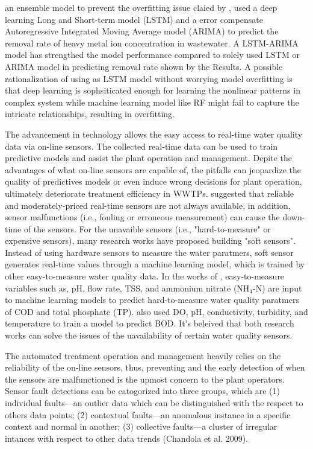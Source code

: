 an ensemble model to prevent the overfitting issue claied by \citet{zaghloulDevelopmentEnsembleMachine2021}, \citet{zhuPredictionMethodElectrocoagulation2021} used a deep learning Long and Short-term model (LSTM) and a error compensate Autoregressive Integrated Moving Average model (ARIMA) to predict the removal rate of heavy metal ion concentration in wastewater. A LSTM-ARIMA model has strengthed the model performance compared to solely used LSTM or ARIMA model in predicting removal rate shown by the Results. A possible rationalization of using as LSTM model without worrying model overfitting is that deep learning is sophsiticated enough for learning the nonlinear patterns in complex system while machine learning model like RF might fail to capture the intricate relationships, resulting in overfitting.

The advancement in technology allows the easy access to real-time water quality data via on-line sensors. The collected real-time data can be used to train predictive models and assist the plant operation and management. Depite the advantages of what on-line sensors are capable of, the pitfalls can jeopardize the quality of predictives models or even induce wrong decisions for plant operation, ultimately deteriorate treatment efficiency in WWTPs. \citet{haimiShallWeUse2015} suggested that reliable and moderately-priced real-time sensors are not always available, in addition, sensor malfunctions (i.e., fouling or erroneous measurement) can cause the down-time of the sensors. For the unavaible sensors (i.e., "hard-to-measure" or expensive sensors), many research works have proposed building "soft sensors". Instead of using hardware sensors to measure the water paratmers, soft sensor generates real-time values through a machine learning model, which is trained by other easy-to-measure water quality data. In the works of \citet{wangExplicitInterpretableNonlinear2019}, easy-to-measure variables such as, pH, flow rate, TSS, and ammonium nitrate (NH$_4$-N) are input to machine learning models to predict hard-to-measure water quality paratmers of COD and total phosphate (TP). \citet{pattnaikMachineLearningBased2021} also used DO, pH, conductivity, turbidity, and temperature to train a model to predict BOD. It's beleived that both research works can solve the issues of the uavailability of certain water quality sensors. 

The automated treatment operation and management heavily relies on the reliability of the on-line sensors, thus, preventing and the early detection of when the sensors are malfunctioned is the upmost concern to the plant operators. Sensor fault detections can be catogorized into three groups, which are (1) individual faults---an outlier data which can be distinguished with the respect to others data points; (2) contextual faults---an anomalous instance in a specific context and normal in another; (3) collective faults---a cluster of irregular intances with respect to other data trends (Chandola et al. 2009). 



